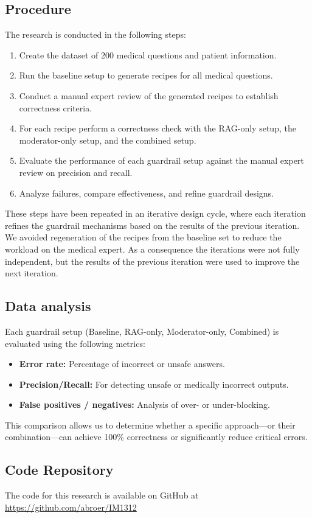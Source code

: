 \subsection{Procedure}

The research is conducted in the following steps:
\begin{enumerate}
    \item Create the dataset of 200 medical questions and patient information.
    \item Run the baseline setup to generate recipes for all medical questions.
    \item Conduct a manual expert review of the generated recipes to establish correctness criteria.
    \item For each recipe perform a correctness check with the RAG-only setup, the moderator-only setup, and the combined setup.
    \item Evaluate the performance of each guardrail setup against the manual expert review on precision and recall.
    \item Analyze failures, compare effectiveness, and refine guardrail designs.
\end{enumerate}

These steps have been repeated in an iterative design cycle, where each iteration refines the guardrail mechanisms based on the results of the previous iteration.
We avoided regeneration of the recipes from the baseline set to reduce the workload on the medical expert.
As a consequence the iterations were not fully independent, but the results of the previous iteration were used to improve the next iteration.

\subsection{Data analysis}

Each guardrail setup (Baseline, RAG-only, Moderator-only, Combined) is evaluated using the following metrics:

\begin{itemize}
    \item \textbf{Error rate:} Percentage of incorrect or unsafe answers.
    \item \textbf{Precision/Recall:} For detecting unsafe or medically incorrect outputs.
    \item \textbf{False positives / negatives:} Analysis of over- or under-blocking.
\end{itemize}

This comparison allows us to determine whether a specific approach—or their combination—can achieve 100\% correctness or significantly reduce critical errors.

\subsection{Code Repository}
The code for this research is available on GitHub at \url{https://github.com/abroer/IM1312}
